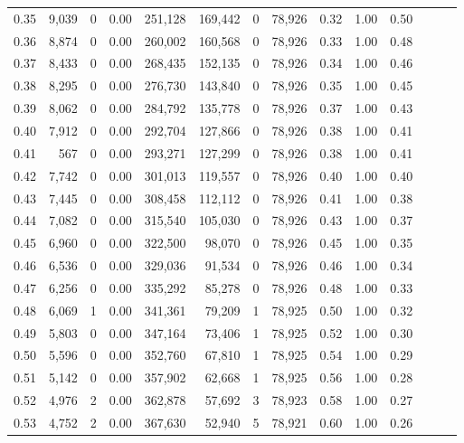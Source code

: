 \begin{tabular}{rrrrrrrrrrrrrr}
0.35 &  9,039 &      0 &  0.00 &  251,128 &  169,442 &       0 &  78,926 &  0.32 &  1.00 &      0.50 \\
0.36 &  8,874 &      0 &  0.00 &  260,002 &  160,568 &       0 &  78,926 &  0.33 &  1.00 &      0.48 \\
0.37 &  8,433 &      0 &  0.00 &  268,435 &  152,135 &       0 &  78,926 &  0.34 &  1.00 &      0.46 \\
0.38 &  8,295 &      0 &  0.00 &  276,730 &  143,840 &       0 &  78,926 &  0.35 &  1.00 &      0.45 \\
0.39 &  8,062 &      0 &  0.00 &  284,792 &  135,778 &       0 &  78,926 &  0.37 &  1.00 &      0.43 \\
0.40 &  7,912 &      0 &  0.00 &  292,704 &  127,866 &       0 &  78,926 &  0.38 &  1.00 &      0.41 \\
0.41 &    567 &      0 &  0.00 &  293,271 &  127,299 &       0 &  78,926 &  0.38 &  1.00 &      0.41 \\
0.42 &  7,742 &      0 &  0.00 &  301,013 &  119,557 &       0 &  78,926 &  0.40 &  1.00 &      0.40 \\
0.43 &  7,445 &      0 &  0.00 &  308,458 &  112,112 &       0 &  78,926 &  0.41 &  1.00 &      0.38 \\
0.44 &  7,082 &      0 &  0.00 &  315,540 &  105,030 &       0 &  78,926 &  0.43 &  1.00 &      0.37 \\
0.45 &  6,960 &      0 &  0.00 &  322,500 &   98,070 &       0 &  78,926 &  0.45 &  1.00 &      0.35 \\
0.46 &  6,536 &      0 &  0.00 &  329,036 &   91,534 &       0 &  78,926 &  0.46 &  1.00 &      0.34 \\
0.47 &  6,256 &      0 &  0.00 &  335,292 &   85,278 &       0 &  78,926 &  0.48 &  1.00 &      0.33 \\
0.48 &  6,069 &      1 &  0.00 &  341,361 &   79,209 &       1 &  78,925 &  0.50 &  1.00 &      0.32 \\
0.49 &  5,803 &      0 &  0.00 &  347,164 &   73,406 &       1 &  78,925 &  0.52 &  1.00 &      0.30 \\
0.50 &  5,596 &      0 &  0.00 &  352,760 &   67,810 &       1 &  78,925 &  0.54 &  1.00 &      0.29 \\
0.51 &  5,142 &      0 &  0.00 &  357,902 &   62,668 &       1 &  78,925 &  0.56 &  1.00 &      0.28 \\
0.52 &  4,976 &      2 &  0.00 &  362,878 &   57,692 &       3 &  78,923 &  0.58 &  1.00 &      0.27 \\
0.53 &  4,752 &      2 &  0.00 &  367,630 &   52,940 &       5 &  78,921 &  0.60 &  1.00 &      0.26 \\

\end{tabular}
